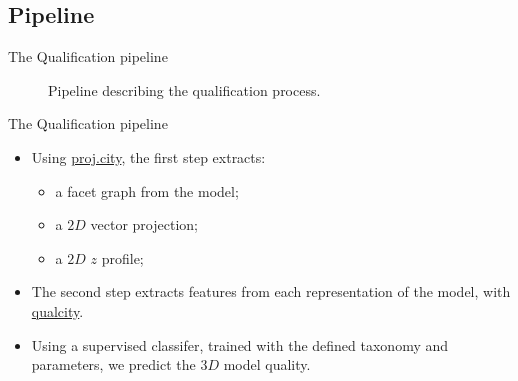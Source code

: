 \documentclass{beamer}
\begin{document}
        \subsection{Pipeline}
            \begin{frame}{The Qualification pipeline}
                \begin{figure}
                    
                    \caption{\label{fig::pipeline} Pipeline describing the qualification process.}
                \end{figure}
            \end{frame}
            \begin{frame}{The Qualification pipeline}
                \begin{itemize}[label=$\blacktriangleright$, font=\color{IGNGreen}]
                    \item<1-> Using \href{https://github.com/ethiy/proj.city}{\textcolor{IGNGreen}{proj.city}}, the first step extracts:
                    \begin{itemize}[label=--]
                        \item<2-> a facet graph from the model;
                        \item<2-> a $2D$ vector projection;
                        \item<2-> a $2D$ $z$ profile;
                    \end{itemize}
                    \item<3-> The second step extracts features from each representation of the model, with \href{https://github.com/ethiy/qualcity}{\textcolor{IGNGreen}{qualcity}}.
                    \item<4-> Using a supervised classifer, trained with the defined taxonomy and parameters, we \textcolor{IGNDarkOrange}{predict} the $3D$ model quality.
                \end{itemize}
            \end{frame}
\end{document}
